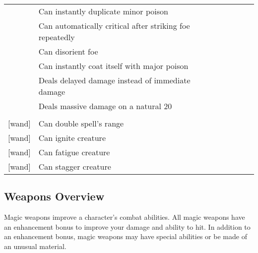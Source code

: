 \begin{longtabuwrapper}
\begin{longtabu}{l X l l l l}
                 & Can instantly duplicate minor poison &  &  \\
                 & Can automatically critical after striking foe repeatedly &  &  \\
                 & Can disorient foe &  &  \\
                 & Can instantly coat itself with major poison &  &  \\
                 & Deals delayed damage instead of immediate damage &  &  \\
                 & Deals massive damage on a natural 20 &  &  \\

                 &  &  &  &  \\
                [wand] & Can double spell's range &  &  \\
                [wand] & Can ignite creature &  &  \\
                [wand] & Can fatigue creature &  &  \\
                [wand] & Can stagger creature &  &  \\
            \end{longtabu}
        \end{longtabuwrapper}
        \twocolumn

    \subsection{Weapons Overview}

        Magic weapons improve a character's combat abilities.
        All magic weapons have an enhancement bonus to improve your damage and ability to hit.
        In addition to an enhancement bonus, magic weapons may have special abilities or be made of an unusual material.

